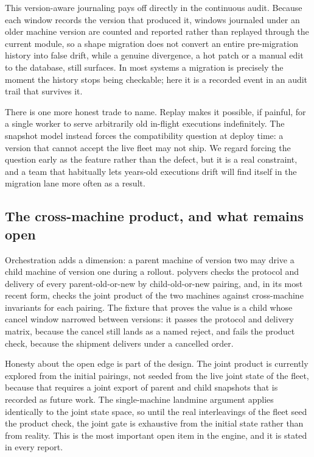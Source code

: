 \documentclass[11pt]{article}
\newcommand{\tool}[1]{\textsf{#1}}
\begin{document}
This version-aware journaling pays off directly in the continuous audit.
Because each window records the version that produced it, windows journaled
under an older machine version are counted and reported rather than replayed
through the current module, so a shape migration does not convert an entire
pre-migration history into false drift, while a genuine divergence, a hot patch
or a manual edit to the database, still surfaces. In most systems a migration is
precisely the moment the history stops being checkable; here it is a recorded
event in an audit trail that survives it.

There is one more honest trade to name. Replay makes it possible, if painful, for
a single worker to serve arbitrarily old in-flight executions indefinitely. The
snapshot model instead forces the compatibility question at deploy time: a
version that cannot accept the live fleet may not ship. We regard forcing the
question early as the feature rather than the defect, but it is a real constraint,
and a team that habitually lets years-old executions drift will find itself in
the migration lane more often as a result.

\subsection{The cross-machine product, and what remains open}\label{sub:product}

Orchestration adds a dimension: a parent machine of version two may drive a
child machine of version one during a rollout. \tool{polyvers} checks the
protocol and delivery of every parent-old-or-new by child-old-or-new pairing,
and, in its most recent form, checks the joint product of the two machines
against cross-machine invariants for each pairing. The fixture that proves the
value is a child whose cancel window narrowed between versions: it passes the
protocol and delivery matrix, because the cancel still lands as a named reject,
and fails the product check, because the shipment delivers under a cancelled
order.

Honesty about the open edge is part of the design. The joint product is
currently explored from the initial pairings, not seeded from the live joint
state of the fleet, because that requires a joint export of parent and child
snapshots that is recorded as future work. The single-machine landmine argument
applies identically to the joint state space, so until the real interleavings of
the fleet seed the product check, the joint gate is exhaustive from the initial
state rather than from reality. This is the most important open item in the
engine, and it is stated in every report.
\end{document}
